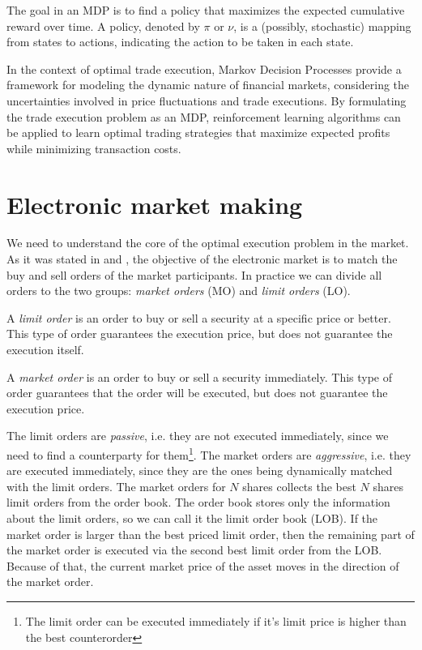     The goal in an MDP is to find a policy that maximizes the expected cumulative reward over time. A policy, denoted by $\pi$ or $\nu$, is a (possibly, stochastic) mapping from states to actions, indicating the action to be taken in each state. 

    In the context of optimal trade execution, Markov Decision Processes provide a framework for modeling the dynamic nature of financial markets, considering the uncertainties involved in price fluctuations and trade executions. By formulating the trade execution problem as an MDP, reinforcement learning algorithms can be applied to learn optimal trading strategies that maximize expected profits while minimizing transaction costs.


\section{Electronic market making}\label{section:ElectronicMM}
    We need to understand the core of the optimal execution problem in the market. 
    As it was stated in \cite{Cartea2015} and \cite{Bouchaud2018},
    the objective of the electronic market is to match the buy and sell orders 
    of the market participants. In practice we can divide all orders to 
    the two groups: \emph{market orders} (MO) and \emph{limit orders} (LO). 
    \begin{definition}
        A \emph{limit order} is an order to buy or sell a security at a specific price or better. This type of order guarantees the execution price, but does not guarantee the execution itself.
    \end{definition}
    \begin{definition}
        A \emph{market order} is an order to buy or sell a security immediately. This type of order guarantees that the order will be executed, but does not guarantee the execution price.
    \end{definition}
    
    The limit orders are \emph{passive}, i.e. they are not executed immediately, since 
    we need to find a counterparty for them\footnote{The limit order can be executed immediately if it's limit price is higher than the best counterorder}. The market orders are \emph{aggressive},
    i.e. they are executed immediately, since they are the ones being dynamically matched with the limit orders. 
    The market orders for $N$ shares collects the best $N$ shares limit orders from the order book.
    The order book stores only the information about the limit orders, so we can call it the limit order book (LOB).
    If the market order is larger than the best priced limit order, then the remaining part of the 
    market order is executed via the second best limit order from the LOB. Because of that, the current 
    market price of the asset moves in the direction of the market order.

